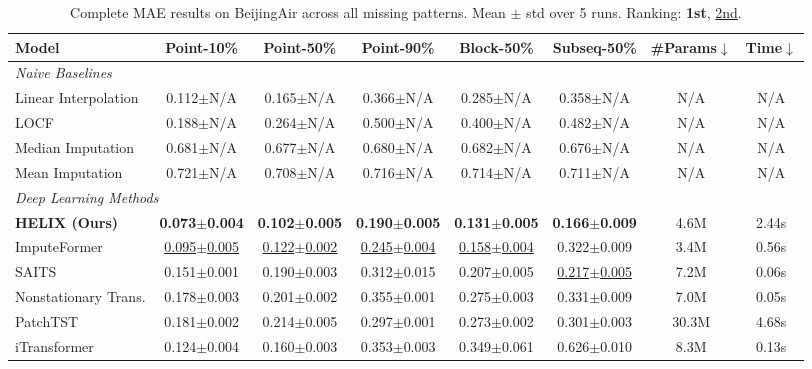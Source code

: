\begin{table}[h]
    \caption{Complete MAE results on BeijingAir across all missing patterns. Mean $\pm$ std over 5 runs. Ranking: \textbf{1st}, \underline{2nd}.}
    \label{tab:full_beijingair}
    \centering
    \begin{footnotesize}
    \begin{tabular}{l|ccccc|cc}
        \toprule
        \textbf{Model} & \textbf{Point-10\%} & \textbf{Point-50\%} & \textbf{Point-90\%} & \textbf{Block-50\%} & \textbf{Subseq-50\%} & \textbf{\#Params}$\downarrow$ & \textbf{Time}$\downarrow$ \\
        \midrule
        \multicolumn{8}{l}{\textit{Naive Baselines}} \\
        Linear Interpolation & 0.112$\pm$N/A & 0.165$\pm$N/A & 0.366$\pm$N/A & 0.285$\pm$N/A & 0.358$\pm$N/A & N/A & N/A \\
        LOCF & 0.188$\pm$N/A & 0.264$\pm$N/A & 0.500$\pm$N/A & 0.400$\pm$N/A & 0.482$\pm$N/A & N/A & N/A \\
        Median Imputation & 0.681$\pm$N/A & 0.677$\pm$N/A & 0.680$\pm$N/A & 0.682$\pm$N/A & 0.676$\pm$N/A & N/A & N/A \\
        Mean Imputation & 0.721$\pm$N/A & 0.708$\pm$N/A & 0.716$\pm$N/A & 0.714$\pm$N/A & 0.711$\pm$N/A & N/A & N/A \\
        \midrule
        \multicolumn{8}{l}{\textit{Deep Learning Methods}} \\
        \textbf{HELIX (Ours)} & \textbf{0.073$\pm$0.004} & \textbf{0.102$\pm$0.005} & \textbf{0.190$\pm$0.005} & \textbf{0.131$\pm$0.005} & \textbf{0.166$\pm$0.009} & 4.6M & 2.44s \\
        ImputeFormer & \underline{0.095$\pm$0.005} & \underline{0.122$\pm$0.002} & \underline{0.245$\pm$0.004} & \underline{0.158$\pm$0.004} & 0.322$\pm$0.009 & 3.4M & 0.56s \\
        SAITS & 0.151$\pm$0.001 & 0.190$\pm$0.003 & 0.312$\pm$0.015 & 0.207$\pm$0.005 & \underline{0.217$\pm$0.005} & 7.2M & 0.06s \\
        Nonstationary Trans. & 0.178$\pm$0.003 & 0.201$\pm$0.002 & 0.355$\pm$0.001 & 0.275$\pm$0.003 & 0.331$\pm$0.009 & 7.0M & 0.05s \\
        PatchTST & 0.181$\pm$0.002 & 0.214$\pm$0.005 & 0.297$\pm$0.001 & 0.273$\pm$0.002 & 0.301$\pm$0.003 & 30.3M & 4.68s \\
        iTransformer & 0.124$\pm$0.004 & 0.160$\pm$0.003 & 0.353$\pm$0.003 & 0.349$\pm$0.061 & 0.626$\pm$0.010 & 8.3M & 0.13s \\

\end{tabular}
\end{footnotesize}
\end{table}

